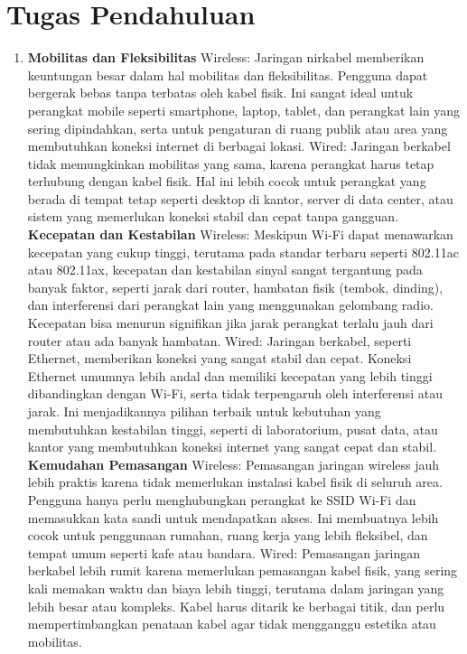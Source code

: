 \section{Tugas Pendahuluan}
\begin{enumerate}
    \item \textbf{Mobilitas dan Fleksibilitas}
    Wireless: Jaringan nirkabel memberikan keuntungan besar dalam hal mobilitas dan fleksibilitas. Pengguna dapat bergerak bebas tanpa terbatas oleh kabel fisik. Ini sangat ideal untuk perangkat mobile seperti smartphone, laptop, tablet, dan perangkat lain yang sering dipindahkan, serta untuk pengaturan di ruang publik atau area yang membutuhkan koneksi internet di berbagai lokasi.
    Wired: Jaringan berkabel tidak memungkinkan mobilitas yang sama, karena perangkat harus tetap terhubung dengan kabel fisik. Hal ini lebih cocok untuk perangkat yang berada di tempat tetap seperti desktop di kantor, server di data center, atau sistem yang memerlukan koneksi stabil dan cepat tanpa gangguan.
    \textbf{Kecepatan dan Kestabilan}
    Wireless: Meskipun Wi-Fi dapat menawarkan kecepatan yang cukup tinggi, terutama pada standar terbaru seperti 802.11ac atau 802.11ax, kecepatan dan kestabilan sinyal sangat tergantung pada banyak faktor, seperti jarak dari router, hambatan fisik (tembok, dinding), dan interferensi dari perangkat lain yang menggunakan gelombang radio. Kecepatan bisa menurun signifikan jika jarak perangkat terlalu jauh dari router atau ada banyak hambatan.
    Wired: Jaringan berkabel, seperti Ethernet, memberikan koneksi yang sangat stabil dan cepat. Koneksi Ethernet umumnya lebih andal dan memiliki kecepatan yang lebih tinggi dibandingkan dengan Wi-Fi, serta tidak terpengaruh oleh interferensi atau jarak. Ini menjadikannya pilihan terbaik untuk kebutuhan yang membutuhkan kestabilan tinggi, seperti di laboratorium, pusat data, atau kantor yang membutuhkan koneksi internet yang sangat cepat dan stabil.
    \textbf{Kemudahan Pemasangan}
    Wireless: Pemasangan jaringan wireless jauh lebih praktis karena tidak memerlukan instalasi kabel fisik di seluruh area. Pengguna hanya perlu menghubungkan perangkat ke SSID Wi-Fi dan memasukkan kata sandi untuk mendapatkan akses. Ini membuatnya lebih cocok untuk penggunaan rumahan, ruang kerja yang lebih fleksibel, dan tempat umum seperti kafe atau bandara.
    Wired: Pemasangan jaringan berkabel lebih rumit karena memerlukan pemasangan kabel fisik, yang sering kali memakan waktu dan biaya lebih tinggi, terutama dalam jaringan yang lebih besar atau kompleks. Kabel harus ditarik ke berbagai titik, dan perlu mempertimbangkan penataan kabel agar tidak mengganggu estetika atau mobilitas.

\end{enumerate}
